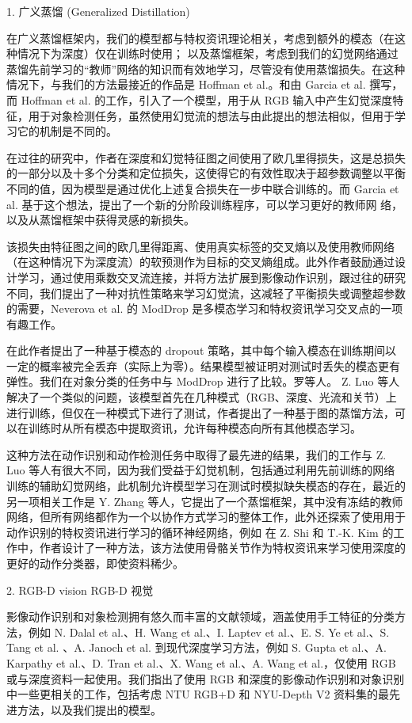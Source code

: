 1. 广义蒸馏 (Generalized Distillation)

在广义蒸馏框架内，我们的模型都与特权资讯理论相关，考虑到额外的模态（在这种情况下为深度）仅在训练时使用； 以及蒸馏框架，考虑到我们的幻觉网络通过蒸馏先前学习的“教师”网络的知识而有效地学习，尽管没有使用蒸馏损失。在这种情况下，与我们的方法最接近的作品是 Hoffman et al.。和由 Garcia et al. 撰写，而 Hoffman et al. 的工作，引入了一个模型，用于从 RGB 输入中产生幻觉深度特征，用于对象检测任务，虽然使用幻觉流的想法与由此提出的想法相似，但用于学习它的机制是不同的。

在过往的研究中，作者在深度和幻觉特征图之间使用了欧几里得损失，这是总损失的一部分以及十多个分类和定位损失，这使得它的有效性取决于超参数调整以平衡不同的值，因为模型是通过优化上述复合损失在一步中联合训练的。而 Garcia et al. 基于这个想法，提出了一个新的分阶段训练程序，可以学习更好的教师网
络，以及从蒸馏框架中获得灵感的新损失。

该损失由特征图之间的欧几里得距离、使用真实标签的交叉熵以及使用教师网络（在这种情况下为深度流）的软预测作为目标的交叉熵组成。此外作者鼓励通过设计学习，通过使用乘数交叉流连接，并将方法扩展到影像动作识别，跟过往的研究不同，我们提出了一种对抗性策略来学习幻觉流，这减轻了平衡损失或调整超参数的需要，Neverova et al. 的 ModDrop 是多模态学习和特权资讯学习交叉点的一项有趣工作。

在此作者提出了一种基于模态的 dropout 策略，其中每个输入模态在训练期间以一定的概率被完全丢弃（实际上为零）。结果模型被证明对测试时丢失的模态更有弹性。我们在对象分类的任务中与 ModDrop 进行了比较。罗等人。 Z. Luo 等人解决了一个类似的问题，该模型首先在几种模式（RGB、深度、光流和关节）上进行训练，但仅在一种模式下进行了测试，作者提出了一种基于图的蒸馏方法，可以在训练时从所有模态中提取资讯，允许每种模态向所有其他模态学习。

这种方法在动作识别和动作检测任务中取得了最先进的结果，我们的工作与 Z. Luo 等人有很大不同，因为我们受益于幻觉机制，包括通过利用先前训练的网络训练的辅助幻觉网络，此机制允许模型学习在测试时模拟缺失模态的存在，最近的另一项相关工作是 Y. Zhang 等人，它提出了一个蒸馏框架，其中没有冻结的教师网络，但所有网络都作为一个以协作方式学习的整体工作，此外还探索了使用用于动作识别的特权资讯进行学习的循环神经网络，例如 在 Z. Shi 和 T.-K. Kim 的工作中，作者设计了一种方法，该方法使用骨骼关节作为特权资讯来学习使用深度的更好的动作分类器，即使资料稀少。

2. RGB-D vision RGB-D 视觉

影像动作识别和对象检测拥有悠久而丰富的文献领域，涵盖使用手工特征的分类方法，例如 N. Dalal et al.、H. Wang et al.、I. Laptev et al.、E. S. Ye et al.、S. Tang et al. 、A. Janoch et al. 到现代深度学习方法，例如 S. Gupta et al.、A. Karpathy et al.、D. Tran et al.、X. Wang et al.、A. Wang et al.，仅使用 RGB 或与深度资料一起使用。我们指出了使用 RGB 和深度的影像动作识别和对象识别中一些更相关的工作，包括考虑 NTU RGB+D 和 NYU-Depth V2 资料集的最先进方法，以及我们提出的模型。


